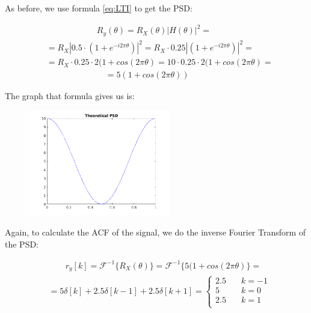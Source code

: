 \documentclass[a4paper,11pt]{article}
\begin{document}
As before, we use formula \eqref{eq:LTI} to get the PSD:

\begin{equation}\label{eq:R_ld_th}
  \begin{split}
   & \qquad\qquad\qquad R_y(\theta) = R_X(\theta) |H(\theta)|^2 = \\
   & = R_X |0.5 \cdot (1 + e^{-i 2 \pi \theta})|^2 =
   R_X \cdot 0.25 |(1 + e^{-i 2 \pi \theta})|^2 = \\
   & = R_X \cdot 0.25 \cdot 2 (1 + cos(2 \pi \theta) =
   10 \cdot 0.25 \cdot 2 (1 + cos(2 \pi \theta) = \\
   & \qquad\qquad\qquad\quad = 5 (1 + cos(2 \pi \theta))
 \end{split}
\end{equation}

\newpage

The graph that formula gives us is:

\begin{figure}[!hp]
    \begin{center}
      \includegraphics[width=0.55\textwidth]{images/study1/R_ld_th.png}
    \end{center}
\end{figure}

Again, to calculate the ACF of the signal, we do the inverse Fourier Transform
of the PSD:

\begin{equation}\label{eq:r_ld_th}
  \begin{split}
     & \qquad r_y[k] = \mathcal{F}^{-1}\{R_X(\theta)\} =
     \mathcal{F}^{-1}\{5 (1 + cos(2 \pi \theta)\} = \\
     & = 5\delta[k] + 2.5\delta[k-1] + 2.5\delta[k+1] =
     \begin{cases}
         2.5 &\quad k = -1\\
         5 &\quad k = 0\\
         2.5 &\quad k = 1\\
     \end{cases}
 \end{split}
\end{equation}
\end{document}
